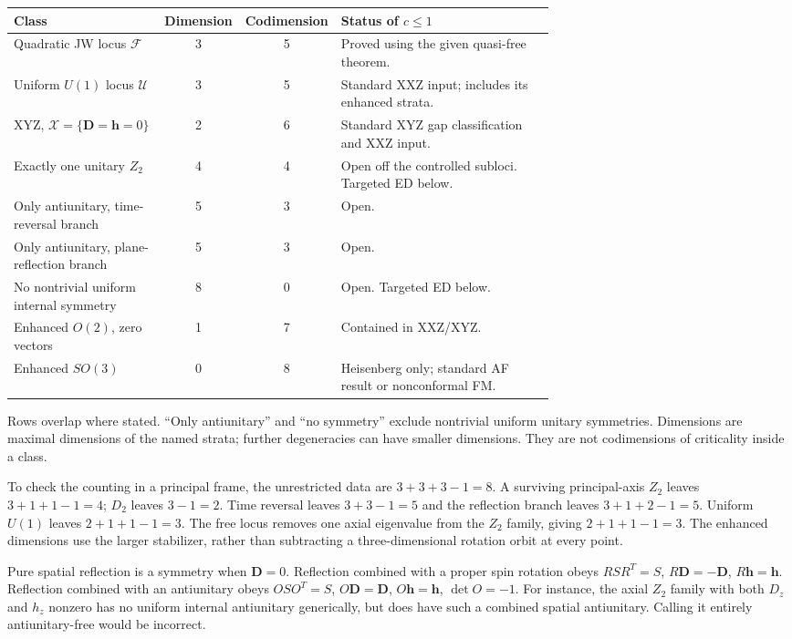 \documentclass[11pt]{article}
\newcommand{\F}{\mathcal F}
\newcommand{\U}{\mathcal U}
\newcommand{\X}{\mathcal X}
\newcommand{\DD}{\boldsymbol D}
\newcommand{\hh}{\boldsymbol h}
\begin{document}
\begin{center}
\small
\begin{tabular}{p{0.29\linewidth}c c p{0.40\linewidth}}
\toprule
Class & Dimension & Codimension & Status of $c\leq1$\\
\midrule
Quadratic JW locus $\F$ & 3 & 5 & Proved using the given quasi-free theorem.\\
Uniform $U(1)$ locus $\U$ & 3 & 5 & Standard XXZ input; includes its enhanced strata.\\
XYZ, $\X=\{\DD=\hh=0\}$ & 2 & 6 & Standard XYZ gap classification and XXZ input.\\
Exactly one unitary $Z_2$ & 4 & 4 & Open off the controlled subloci. Targeted ED below.\\
Only antiunitary, time-reversal branch & 5 & 3 & Open.\\
Only antiunitary, plane-reflection branch & 5 & 3 & Open.\\
No nontrivial uniform internal symmetry & 8 & 0 & Open. Targeted ED below.\\
Enhanced $O(2)$, zero vectors & 1 & 7 & Contained in XXZ/XYZ.\\
Enhanced $SO(3)$ & 0 & 8 & Heisenberg only; standard AF result or nonconformal FM.\\
\bottomrule
\end{tabular}
\end{center}
Rows overlap where stated. ``Only antiunitary'' and ``no symmetry'' exclude
nontrivial uniform unitary symmetries. Dimensions are maximal dimensions of
the named strata; further degeneracies can have smaller dimensions. They are
not codimensions of criticality inside a class.

To check the counting in a principal frame, the unrestricted data are
$3+3+3-1=8$. A surviving principal-axis $Z_2$ leaves $3+1+1-1=4$;
$D_2$ leaves $3-1=2$. Time reversal leaves $3+3-1=5$ and the reflection branch
leaves $3+1+2-1=5$. Uniform $U(1)$ leaves $2+1+1-1=3$. The free locus removes
one axial eigenvalue from the $Z_2$ family, giving $2+1+1-1=3$.
The enhanced dimensions use the larger stabilizer, rather than subtracting a
three-dimensional rotation orbit at every point.

Pure spatial reflection is a symmetry when $\DD=0$. Reflection combined with
a proper spin rotation obeys
$RSR^T=S$, $R\DD=-\DD$, $R\hh=\hh$.
Reflection combined with an antiunitary obeys
$OSO^T=S$, $O\DD=\DD$, $O\hh=\hh$, $\det O=-1$.
For instance, the axial $Z_2$ family with both $D_z$ and $h_z$ nonzero has no
uniform internal antiunitary generically, but does have such a combined
spatial antiunitary. Calling it entirely antiunitary-free would be incorrect.
\end{document}
